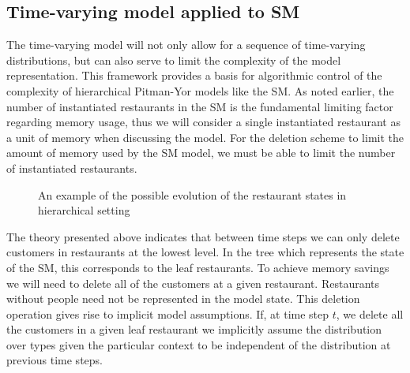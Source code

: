 \subsection{Time-varying model applied to SM}

The time-varying model will not only allow for a sequence of time-varying distributions, but can also serve to limit the complexity of the model representation. This framework provides a basis for algorithmic control of the complexity of hierarchical Pitman-Yor models like the SM.  As noted earlier, the number of instantiated restaurants in the SM is the fundamental limiting factor regarding memory usage, thus we will consider a single instantiated restaurant as a unit of memory when discussing the model. For the deletion scheme to limit the amount of memory used by the SM model, we must be able to limit the number of instantiated restaurants.

\begin{figure}[t] 
	\begin{center}
		\caption{An example of the possible evolution of the restaurant states in hierarchical setting}
	\end{center} 
	\label{figResultsCC}
\end{figure} 

The theory presented above indicates that between time steps we can only delete customers in restaurants at the lowest level.  In the tree which represents the state of the SM, this corresponds to the leaf restaurants.  To achieve memory savings we will need to delete all of the customers at a given restaurant.  Restaurants without people need not be represented in the model state.  This deletion operation gives rise to implicit model assumptions. If, at time step $t$, we delete all the customers in a given leaf restaurant we implicitly assume the distribution over types given the particular context to be independent of the distribution at previous time steps.


